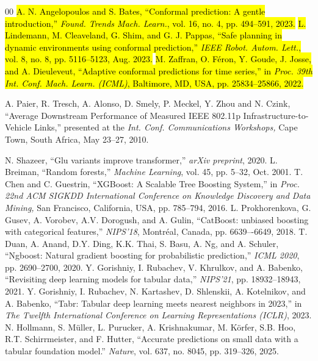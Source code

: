 \documentclass[journal]{IEEEtran}
\begin{document}
\begin{thebibliography}{00}
 \hl{A. N. Angelopoulos and S. Bates, ``Conformal prediction: A gentle introduction,'' \emph{Found. Trends Mach. Learn.}, vol. 16, no. 4, pp. 494--591, 2023.}
 \hl{L. Lindemann, M. Cleaveland, G. Shim, and G. J. Pappas, ``Safe planning in dynamic environments using conformal prediction,'' \emph{IEEE Robot. Autom. Lett.}, vol. 8, no. 8, pp. 5116--5123, Aug. 2023.}
 \hl{M. Zaffran, O. F\'{e}ron, Y. Goude, J. Josse, and A. Dieuleveut, ``Adaptive conformal predictions for time series,'' in \emph{Proc. 39th Int. Conf. Mach. Learn. (ICML)}, Baltimore, MD, USA, pp. 25834--25866, 2022.}


 A. Paier, R. Tresch, A. Alonso, D. Smely, P. Meckel, Y. Zhou and N. Czink, ``Average Downstream Performance of Measured IEEE 802.11p Infrastructure-to-Vehicle Links,'' presented at the \emph{Int. Conf. Communications Workshops,} Cape Town, South Africa, May 23--27, 2010.


 N. Shazeer, ``Glu variants improve transformer,'' \emph{arXiv preprint}, 2020.
 L. Breiman, ``Random forests,'' \emph{Machine Learning}, vol. 45, pp. 5--32, Oct. 2001.
 T. Chen and C. Guestrin, ``XGBoost: A Scalable Tree Boosting System,'' in \emph{Proc. 22nd ACM SIGKDD International Conference on Knowledge Discovery and Data Mining,} San Francisco, California, USA, pp. 785--794, 2016.
 L. Prokhorenkova, G. Gusev, A. Vorobev, A.V. Dorogush, and A. Gulin, ``CatBoost: unbiased boosting with categorical features,'' \emph{NIPS'18}, Montr\'{e}al, Canada, pp. 6639–-6649, 2018.
 T. Duan, A. Anand, D.Y. Ding, K.K. Thai, S. Basu, A. Ng, and A. Schuler, ``Ngboost: Natural gradient boosting for probabilistic prediction,'' \emph{ICML 2020}, pp. 2690--2700, 2020.
 Y. Gorishniy, I. Rubachev, V. Khrulkov, and A. Babenko, ``Revisiting deep learning models for tabular data,'' \emph{NIPS'21}, pp. 18932--18943, 2021.
 Y. Gorishniy, I. Rubachev, N. Kartashev, D. Shlenskii, A. Kotelnikov, and A. Babenko, ``Tabr: Tabular deep learning meets nearest neighbors in 2023,'' in \emph{The Twelfth International Conference on Learning Representations (ICLR)}, 2023.
 N. Hollmann, S. Müller, L. Purucker, A. Krishnakumar, M. Körfer, S.B. Hoo, R.T. Schirrmeister, and F. Hutter, ``Accurate predictions on small data with a tabular foundation model.'' \emph{Nature}, vol. 637, no. 8045, pp. 319--326, 2025.



\end{thebibliography}
\end{document}
